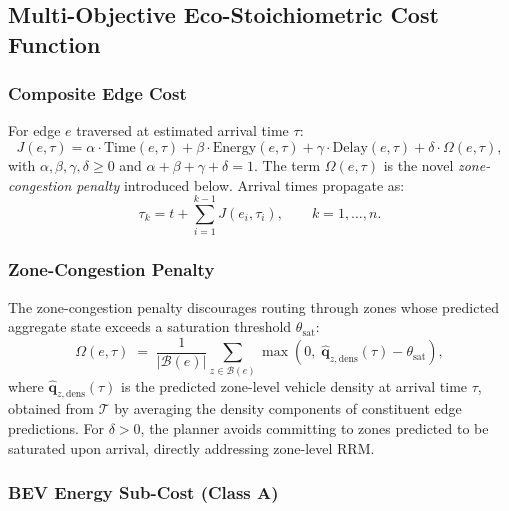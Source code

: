 \documentclass[journal,letterpaper,10pt]{IEEEtran}
\theoremstyle{definition}
\theoremstyle{remark}
\newcommand{\zstate}{\mathbf{q}}
\begin{document}
\subsection{Multi-Objective Eco-Stoichiometric Cost Function}
\label{sec:cost}

\subsubsection{Composite Edge Cost}

For edge $e$ traversed at estimated arrival time $\tau$:
\begin{equation}
  J(e,\tau)
  =
  \alpha\cdot\mathrm{Time}(e,\tau)
  +\beta\cdot\mathrm{Energy}(e,\tau)
  +\gamma\cdot\mathrm{Delay}(e,\tau)
  +\delta\cdot\Omega(e,\tau),
  \label{eq:cost}
\end{equation}
with $\alpha,\beta,\gamma,\delta\geq0$ and
$\alpha+\beta+\gamma+\delta=1$.  The term $\Omega(e,\tau)$ is the
novel \emph{zone-congestion penalty} introduced below.  Arrival
times propagate as:
\begin{equation}
  \tau_k
  =
  t + \sum_{i=1}^{k-1}J(e_i,\tau_i),
  \qquad k=1,\ldots,n.
  \label{eq:arrival_time}
\end{equation}

\subsubsection{Zone-Congestion Penalty}

The zone-congestion penalty discourages routing through zones whose
predicted aggregate state exceeds a saturation threshold
$\theta_{\mathrm{sat}}$:
\begin{equation}
  \Omega(e,\tau)
  \;=\;
  \frac{1}{|\mathcal{B}(e)|}
  \sum_{z\in\mathcal{B}(e)}
  \max\!\left(0,\;
    \hat{\zstate}_{z,\mathrm{dens}}(\tau) - \theta_{\mathrm{sat}}
  \right),
  \label{eq:zone_penalty}
\end{equation}
where $\hat{\zstate}_{z,\mathrm{dens}}(\tau)$ is the predicted
zone-level vehicle density at arrival time $\tau$, obtained from
$\mathcal{T}$ by averaging the density components of constituent
edge predictions.  For $\delta>0$, the planner avoids committing to
zones predicted to be saturated upon arrival, directly addressing
zone-level RRM.

\subsubsection{BEV Energy Sub-Cost (Class A)}
\end{document}
